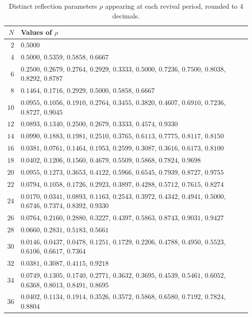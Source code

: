 \begin{table}[htbp]
\centering
\caption{Distinct reflection parameters $\rho$ appearing at each revival period, rounded to 4 decimals.}
\label{tab:rho-by-period}
\begin{tabular}{rl}
\toprule
$N$ & Values of $\rho$ \\
\midrule
$2$ & $0.5000$ \\
$4$ & $0.5000$, $0.5359$, $0.5858$, $0.6667$ \\
$6$ & $0.2500$, $0.2679$, $0.2764$, $0.2929$, $0.3333$, $0.5000$, $0.7236$, $0.7500$, $0.8038$, $0.8292$, $0.8787$ \\
$8$ & $0.1464$, $0.1716$, $0.2929$, $0.5000$, $0.5858$, $0.6667$ \\
$10$ & $0.0955$, $0.1056$, $0.1910$, $0.2764$, $0.3455$, $0.3820$, $0.4607$, $0.6910$, $0.7236$, $0.8727$, $0.9045$ \\
$12$ & $0.0893$, $0.1340$, $0.2500$, $0.2679$, $0.3333$, $0.4574$, $0.9330$ \\
$14$ & $0.0990$, $0.1883$, $0.1981$, $0.2510$, $0.3765$, $0.6113$, $0.7775$, $0.8117$, $0.8150$ \\
$16$ & $0.0381$, $0.0761$, $0.1464$, $0.1953$, $0.2599$, $0.3087$, $0.3616$, $0.6173$, $0.8100$ \\
$18$ & $0.0402$, $0.1206$, $0.1560$, $0.4679$, $0.5509$, $0.5868$, $0.7824$, $0.9698$ \\
$20$ & $0.0955$, $0.1273$, $0.3653$, $0.4122$, $0.5966$, $0.6545$, $0.7939$, $0.8727$, $0.9755$ \\
$22$ & $0.0794$, $0.1058$, $0.1726$, $0.2923$, $0.3897$, $0.4288$, $0.5712$, $0.7615$, $0.8274$ \\
$24$ & $0.0170$, $0.0341$, $0.0893$, $0.1163$, $0.2543$, $0.3972$, $0.4342$, $0.4941$, $0.5000$, $0.6746$, $0.7374$, $0.8392$, $0.9330$ \\
$26$ & $0.0764$, $0.2160$, $0.2880$, $0.3227$, $0.4397$, $0.5863$, $0.8743$, $0.9031$, $0.9427$ \\
$28$ & $0.0660$, $0.2831$, $0.5183$, $0.5661$ \\
$30$ & $0.0146$, $0.0437$, $0.0478$, $0.1251$, $0.1729$, $0.2206$, $0.4788$, $0.4950$, $0.5523$, $0.6106$, $0.6617$, $0.7364$ \\
$32$ & $0.0381$, $0.3087$, $0.4115$, $0.9218$ \\
$34$ & $0.0749$, $0.1305$, $0.1740$, $0.2771$, $0.3632$, $0.3695$, $0.4539$, $0.5461$, $0.6052$, $0.6368$, $0.8013$, $0.8491$, $0.8695$ \\
$36$ & $0.0402$, $0.1134$, $0.1914$, $0.3526$, $0.3572$, $0.5868$, $0.6580$, $0.7192$, $0.7824$, $0.8804$ \\

\end{tabular}
\end{table}

